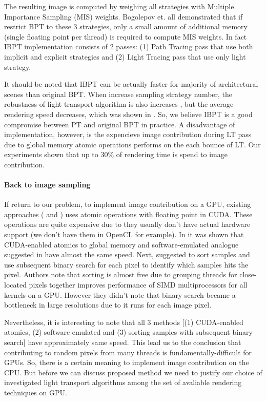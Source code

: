 \documentclass[twoside,twocolumn,10pt]{article}
\begin{document}
The resulting image is computed by weighing all strategies with Multiple Importance Sampling (MIS) weights. Bogolepov et. all demonstrated that if restrict BPT to these 3 strategies, only a small amount of additional memory (single floating point per thread) is required to compute MIS weights. In fact IBPT implementation consists of 2 passes: (1) Path Tracing pass that use both implicit and explicit strategies and (2) Light Tracing pass that use only light strategy.  

It should be noted that IBPT can be actually faster for majority of architectural scenes than original BPT. When increase sampling strategy number, the robustness of light transport algorithm is also increases \cite{Veach98}, but the average rendering speed decreases, which was shown in \cite{PCBPT}. So, we believe IBPT is a good compromise between PT and original BPT in practice. A disadvantage of \cite{Bogolepov13} implementation, however, is the expencieve image contribution during LT pass due to global memory atomic operations performs on the each bounce of LT. Our experiments shown that up to 30\% of rendering time is spend to image contribution. 

\paragraph{Back to image sampling}
If return to our problem, to implement image contribution on a GPU, existing approaches (\cite{Antwerpen11} and \cite{Bogolepov13}) uses atomic operations with floating point in CUDA. These operations are quite expensive due to they usually don't have actual hardware support (we don't have them in OpenCL for example). In \cite{MemCompactMLT} it was shown that CUDA-enabled atomics to global memory and software-emulated analogue suggested in \cite{atomicsCL} have almost the same speed. Next, \cite{MemCompactMLT} suggested to sort samples and use subsequent binary search for each pixel to identify which samples hits the pixel. Authors note that sorting is almost free due to grouping threads for close-located pixels together improves performance of SIMD multiprocessors for all kernels on a GPU. However they didn't note that binary search became a bottleneck in large resolutions due to it runs for each image pixel. 

Nevertheless, it is interesting to note that all 3 methods [(1) CUDA-enabled atomics, (2) software emulated and (3) sorting samples with subsequent binary search] have approximately same speed. This lead us to the conclusion that contributing to random pixels from many threads is fundamentally-difficult for GPUs. So, there is a certain meaning to implement image contribution on the CPU. But before we can discuss proposed method we need to justify our choice of investigated light transport algorithms among the set of avaliable rendering techniques on GPU. 
\end{document}
